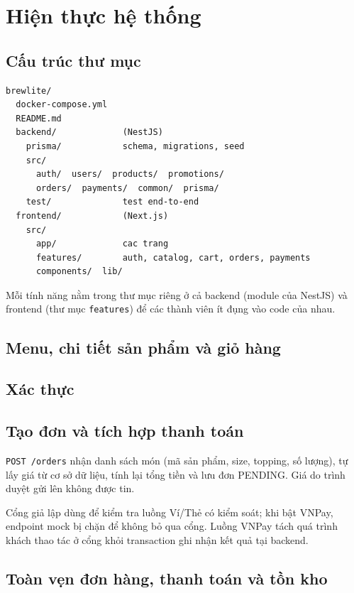 \documentclass[a4paper]{article}
\begin{document}
\section{Hiện thực hệ thống}
\subsection{Cấu trúc thư mục}
\begin{lstlisting}[style=brew,language={}]
brewlite/
  docker-compose.yml
  README.md
  backend/             (NestJS)
    prisma/            schema, migrations, seed
    src/
      auth/  users/  products/  promotions/
      orders/  payments/  common/  prisma/
    test/              test end-to-end
  frontend/            (Next.js)
    src/
      app/             cac trang
      features/        auth, catalog, cart, orders, payments
      components/  lib/
\end{lstlisting}
Mỗi tính năng nằm trong thư mục riêng ở cả backend (module của NestJS) và frontend (thư mục \texttt{features}) để các thành viên ít đụng vào code của nhau.

\subsection{Menu, chi tiết sản phẩm và giỏ hàng}


\subsection{Xác thực}


\subsection{Tạo đơn và tích hợp thanh toán}
\texttt{POST /orders} nhận danh sách món (mã sản phẩm, size, topping, số lượng), tự lấy giá từ cơ sở dữ liệu, tính lại tổng tiền và lưu đơn PENDING. Giá do trình duyệt gửi lên không được tin.

Cổng giả lập dùng để kiểm tra luồng Ví/Thẻ có kiểm soát; khi bật VNPay, endpoint mock bị chặn để không bỏ qua cổng. Luồng VNPay tách quá trình khách thao tác ở cổng khỏi transaction ghi nhận kết quả tại backend.



\subsection{Toàn vẹn đơn hàng, thanh toán và tồn kho}
\end{document}
